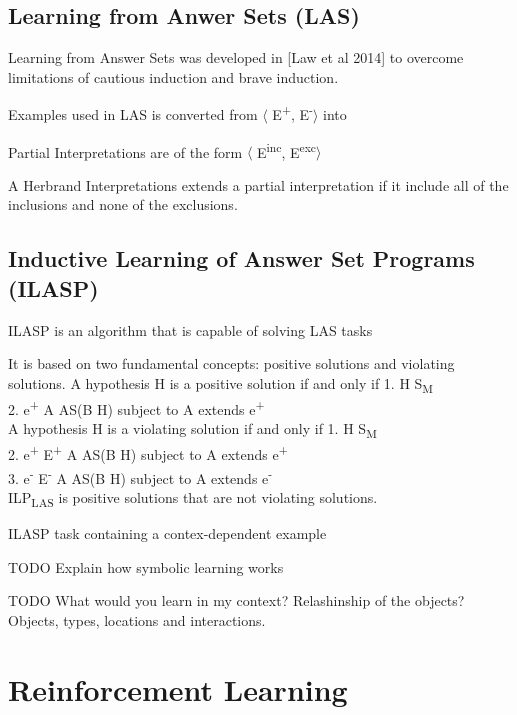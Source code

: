 \documentclass[12pt,twoside]{report}
\begin{document}
\subsection{Learning from Anwer Sets (LAS)}

Learning from Answer Sets was developed in [Law et al 2014] to overcome limitations of cautious induction and brave induction.


Examples used in LAS is converted from $\langle$ E\textsuperscript{+}, E\textsuperscript{-}$\rangle$ into

Partial Interpretations are of the form $\langle$ E\textsuperscript{inc}, E\textsuperscript{exc}$\rangle$

A Herbrand Interpretations extends a partial interpretation if it include all of the inclusions and none of the exclusions.

\subsection{Inductive Learning of Answer Set Programs (ILASP)}

ILASP is an algorithm that is capable of solving LAS tasks

It is based on two fundamental concepts: positive solutions and violating solutions.
A hypothesis H is a positive solution if and only if
1. H \subseteq S\textsubscript{M} \\
2. \forall e\textsuperscript{+} \in \exists A \in AS(B \cup H) subject to A extends e\textsuperscript{+}\\

A hypothesis H is a violating solution if and only if
1. H \subseteq S\textsubscript{M} \\
2. \forall e\textsuperscript{+} \in E\textsuperscript{+} \exists A \in AS(B \cup H) subject to A extends e\textsuperscript{+}\\
3. \exists e\textsuperscript{-} \in E\textsuperscript{-} \exists A \in AS(B \cup H) subject to A extends e\textsuperscript{-}\\


ILP\textsubscript{LAS} is positive solutions that are not violating solutions.

ILASP task containing a contex-dependent example

TODO Explain how symbolic learning works

TODO What would you learn in my context? Relashinship of the objects?
Objects, types, locations and interactions.

\section{Reinforcement Learning}
\label{rl}
\end{document}
